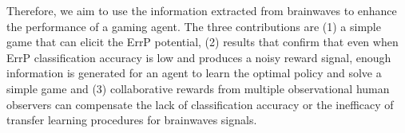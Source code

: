 \documentclass[journal]{IEEEtran}
\begin{document}
Therefore,  we aim to use the information extracted from brainwaves to enhance the performance of a gaming agent.  The three contributions are (1) a simple game that can elicit the ErrP potential, (2) results that confirm that even when ErrP classification accuracy is low and produces a noisy reward signal, enough information is generated for an agent to learn the optimal policy and solve a simple game and (3) collaborative rewards from multiple observational human observers can compensate the lack of classification accuracy or the inefficacy of transfer learning procedures for brainwaves signals.


%
%



%
%
\end{document}
